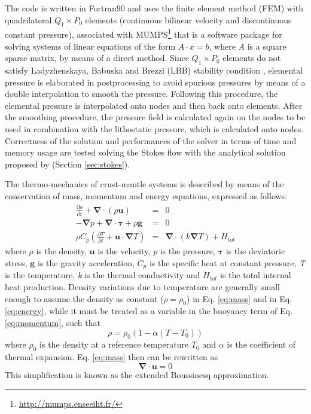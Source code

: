 \documentclass[hidelinks,11pt,a4paper]{article}
\begin{document}
The code is written in Fortran90 and uses the finite element method (FEM) with quadrilateral $Q_1 \times P_0$ elements (continuous bilinear velocity and discontinuous constant pressure), associated with MUMPS\footnote{\url{http://mumps.enseeiht.fr/}} \citep{Amestoy2001,Amestoy2019} that is a software package for solving systems of linear equations of the form $A \cdot x = b$, where \textit{A} is a square sparse matrix, by means of a direct method. Since $Q_1 \times P_0$ elements do not satisfy Ladyzhenskaya, Babuska and Brezzi (LBB) stability condition \citep{Donea2003}, elemental pressure is elaborated in postprocessing to avoid spurious pressures by means of a double interpolation to smooth the pressure. Following this procedure, the elemental pressure is interpolated onto nodes and then back onto elements. After the smoothing procedure, the pressure field is calculated again on the nodes to be used in combination with the lithostatic pressure, which is calculated onto nodes. Correctness of the solution and performances of the solver in terms of time and memory usage are tested solving the Stokes flow with the analytical solution proposed by \citet{Donea2003} (Section \ref{sec:stokes}).

The thermo-mechanics of crust-mantle systems is described by means of the conservation of mass, momentum and energy equations, expressed as follows:
\begin{eqnarray}
\label{eq:mass}\frac{\partial \rho}{\partial t}+\bm{\nabla} \cdot (\rho \bm{u})&=&0\\
\label{eq:momentum}-\bm{\nabla} p + \bm{\nabla} \cdot \bm{\tau} + \rho \bm{g}&=&0\\
\label{eq:energy}\rho C_p \left(\frac{\partial T}{\partial t} + \bm{u} \cdot \bm{\nabla} T \right)&=&\bm{\nabla} \cdot \left(k\bm{\nabla} T\right) + H_{tot}
\end{eqnarray}
where $\rho$ is the density, $\bm{u}$ is the velocity, \textit{p} is the pressure, $\bm{\tau}$ is the deviatoric stress, $\bm{g}$ is the gravity acceleration, $C_p$ is the specific heat at constant pressure, \textit{T} is the temperature, \textit{k} is the thermal conductivity and $H_{tot}$ is the total internal heat production. Density variations due to temperature are generally small enough to assume the density as constant ($\rho=\rho_0$) in Eq. \ref{eq:mass} and in Eq. \ref{eq:energy}, while it must be treated as a variable in the buoyancy term of Eq. \ref{eq:momentum}, such that \[\rho=\rho_0(1-\alpha(T-T_0))\]
where $\rho_0$ is the density at a reference temperature $T_0$ and $\alpha$ is the coefficient of thermal expansion. Eq. \ref{eq:mass} then can be rewritten as
\begin{equation}\label{eq:mass_0}
\bm{\nabla} \cdot \bm{u}=0
\end{equation}
This simplification is known as the extended Boussinesq approximation.
\end{document}
